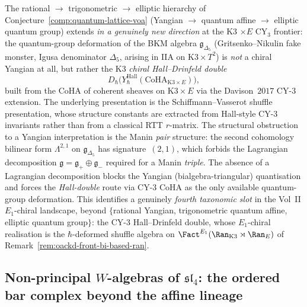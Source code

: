 \begin{remark}
\label{rem:oackd-front-hall-drinfeld-double}
%
%
%
%
%
%
The rational $\to$ trigonometric $\to$ elliptic hierarchy of
Conjecture~\ref{comp:quantum-lattice-voa} (Yangian $\to$ quantum
affine $\to$ elliptic quantum group) extends \emph{in a
genuinely new direction} at the K3 $\times E$ CY$_3$ frontier:
the quantum-group deformation of the BKM algebra
$\mathfrak{g}_{\Delta_5}$ (Gritsenko--Nikulin fake monster,
Igusa denominator $\Delta_5$, arising in IIA on
$\mathrm{K3}\times T^2$) is \emph{not} a chiral Yangian at all,
but rather the K3 \emph{chiral Hall--Drinfeld double}
\[
 D_\hbar\bigl(Y_\hbar^{\mathrm{Hall}}(\mathrm{CoHA}_{\mathrm{K3}\times E})\bigr),
\]
built from the CoHA of coherent sheaves on $\mathrm{K3}\times E$
via the Davison~$2017$ CY-$3$ extension. The underlying
presentation is the Schiffmann--Vasserot shuffle
presentation, whose structure constants are extracted from
Hall-style CY-$3$ invariants rather than from a classical
RTT $r$-matrix. The structural obstruction to a Yangian
interpretation is the Manin \emph{pair} structure: the
second cohomology bilinear form
$\Lambda^{2,1}$ on $\mathfrak{g}_{\Delta_5}$ has
signature~$(2,1)$, which forbids the Lagrangian
decomposition $\mathfrak{g} = \mathfrak{g}_+ \oplus
\mathfrak{g}_-$ required for a Manin \emph{triple}. The
absence of a Lagrangian decomposition blocks the Yangian
(bialgebra-triangular) quantisation and forces the
\emph{Hall-double} route via CY-$3$ CoHA as the only
available quantum-group deformation. This identifies a
genuinely \emph{fourth taxonomic slot} in the Vol~II $E_1$-chiral
landscape, beyond $\{$rational Yangian, trigonometric quantum
affine, elliptic quantum group$\}$: the CY-$3$ Hall--Drinfeld
double, whose $E_1$-chiral realisation is the $\hbar$-deformed
shuffle algebra on $\Fact^{E_1}(\Ran_{\mathrm{K3}} \rtimes
\Ran_E)$ of Remark~\ref{rem:oackd-front-bi-based-ran}.
\end{remark}

\subsection{Non-principal $W$-algebras of
\texorpdfstring{$\mathfrak{sl}_4$}{sl(4)}:
the ordered bar complex beyond the affine lineage}
\label{subsec:ordered-bar-sl4-nonprincipal}

